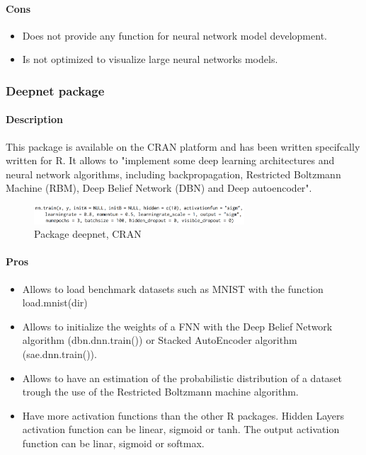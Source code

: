 \documentclass[letter]{article}\usepackage[]{graphicx}\usepackage[]{color}
\begin{document}
\paragraph{Cons}
\begin{itemize}
\item Does not provide any function for neural network model development.
\item Is not optimized to visualize large neural networks models.
\end{itemize}

\subsubsection{Deepnet package}
\paragraph{Description}
This package is available on the CRAN platform and has been written specifcally written for R. It allows to "implement some deep learning architectures and neural network algorithms, including backpropagation, Restricted Boltzmann Machine (RBM), Deep Belief Network (DBN) and Deep autoencoder".
\begin{figure}[h]
    \centering
    \includegraphics[width=0.7\textwidth]{figure/deepnet_package.png}
     \caption{Package deepnet, CRAN}
\end{figure}
\paragraph{Pros}
\begin{itemize}
\item Allows to load benchmark datasets such as MNIST with the function load.mnist(dir)
\item Allows to initialize the weights of a FNN with the Deep Belief Network algorithm (dbn.dnn.train()) or Stacked AutoEncoder algorithm (sae.dnn.train()).
\item Allows to have an estimation of the probabilistic distribution of a dataset trough the use of the Restricted Boltzmann machine algorithm.
\item Have more activation functions than the other R packages. Hidden Layers activation function can be linear, sigmoid or tanh. The output activation function can be linar, sigmoid or softmax.
\end{itemize}
\end{document}
